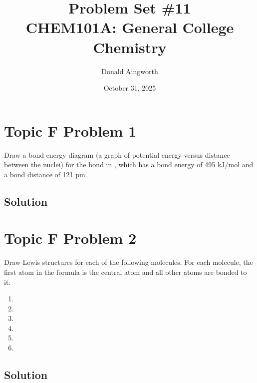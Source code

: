 \documentclass[10pt]{article}
\title{
    Problem Set \#11
    \\  \small
    CHEM101A: General College Chemistry
    }
\author{Donald Aingworth}
\date{October 31, 2025}
\begin{document}

    \maketitle


    \pagebreak
    \section{Topic F Problem 1}
        Draw a bond energy diagram (a graph of potential energy versus distance between the nuclei) for the bond in , which has a bond energy of 495 kJ/mol and a bond distance of 121 pm.
        
        \subsection{Solution}

    \pagebreak
    \section{Topic F Problem 2}
        Draw Lewis structures for each of the following molecules. 
        For each molecule, the first atom in the formula is the central atom and all other atoms are bonded to it.
        \begin{multicols}{3}
            \begin{enumerate}[label=\alph*)]
                \item   {}
                \item   {}
                \item   {}
                \item   {}
                \item   {}
                \item   {}
            \end{enumerate}
        \end{multicols}
        
        \subsection{Solution}


    \pagebreak
\end{document}
